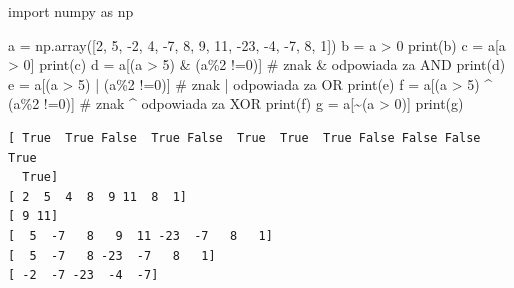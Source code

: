 \documentclass[
  polish,
  letterpaper,
  DIV=11,
  numbers=noendperiod]{scrreprt}
\newenvironment{Shaded}{\begin{snugshade}}{\end{snugshade}}
\newcommand{\BuiltInTok}[1]{\textcolor[rgb]{0.00,0.23,0.31}{#1}}
\newcommand{\CommentTok}[1]{\textcolor[rgb]{0.37,0.37,0.37}{#1}}
\newcommand{\DecValTok}[1]{\textcolor[rgb]{0.68,0.00,0.00}{#1}}
\newcommand{\ImportTok}[1]{\textcolor[rgb]{0.00,0.46,0.62}{#1}}
\newcommand{\NormalTok}[1]{\textcolor[rgb]{0.00,0.23,0.31}{#1}}
\newcommand{\OperatorTok}[1]{\textcolor[rgb]{0.37,0.37,0.37}{#1}}
\begin{document}
\begin{Shaded}
\begin{Highlighting}[]
\ImportTok{import}\NormalTok{ numpy }\ImportTok{as}\NormalTok{ np}

\NormalTok{a }\OperatorTok{=}\NormalTok{ np.array([}\DecValTok{2}\NormalTok{, }\DecValTok{5}\NormalTok{, }\OperatorTok{{-}}\DecValTok{2}\NormalTok{, }\DecValTok{4}\NormalTok{, }\OperatorTok{{-}}\DecValTok{7}\NormalTok{, }\DecValTok{8}\NormalTok{, }\DecValTok{9}\NormalTok{, }\DecValTok{11}\NormalTok{, }\OperatorTok{{-}}\DecValTok{23}\NormalTok{, }\OperatorTok{{-}}\DecValTok{4}\NormalTok{, }\OperatorTok{{-}}\DecValTok{7}\NormalTok{, }\DecValTok{8}\NormalTok{, }\DecValTok{1}\NormalTok{])}
\NormalTok{b }\OperatorTok{=}\NormalTok{ a }\OperatorTok{\textgreater{}} \DecValTok{0}
\BuiltInTok{print}\NormalTok{(b)}
\NormalTok{c }\OperatorTok{=}\NormalTok{ a[a }\OperatorTok{\textgreater{}} \DecValTok{0}\NormalTok{]}
\BuiltInTok{print}\NormalTok{(c)}
\NormalTok{d }\OperatorTok{=}\NormalTok{ a[(a }\OperatorTok{\textgreater{}} \DecValTok{5}\NormalTok{) }\OperatorTok{\&}\NormalTok{ (a}\OperatorTok{\%}\DecValTok{2} \OperatorTok{!=}\DecValTok{0}\NormalTok{)] }\CommentTok{\# znak \& odpowiada za AND}
\BuiltInTok{print}\NormalTok{(d)}
\NormalTok{e }\OperatorTok{=}\NormalTok{ a[(a }\OperatorTok{\textgreater{}} \DecValTok{5}\NormalTok{) }\OperatorTok{|}\NormalTok{ (a}\OperatorTok{\%}\DecValTok{2} \OperatorTok{!=}\DecValTok{0}\NormalTok{)] }\CommentTok{\# znak | odpowiada za OR}
\BuiltInTok{print}\NormalTok{(e)}
\NormalTok{f }\OperatorTok{=}\NormalTok{ a[(a }\OperatorTok{\textgreater{}} \DecValTok{5}\NormalTok{) }\OperatorTok{\^{}}\NormalTok{ (a}\OperatorTok{\%}\DecValTok{2} \OperatorTok{!=}\DecValTok{0}\NormalTok{)] }\CommentTok{\# znak \^{} odpowiada za XOR}
\BuiltInTok{print}\NormalTok{(f)}
\NormalTok{g }\OperatorTok{=}\NormalTok{ a[}\OperatorTok{\textasciitilde{}}\NormalTok{(a }\OperatorTok{\textgreater{}} \DecValTok{0}\NormalTok{)]}
\BuiltInTok{print}\NormalTok{(g)}
\end{Highlighting}
\end{Shaded}

\begin{verbatim}
[ True  True False  True False  True  True  True False False False  True
  True]
[ 2  5  4  8  9 11  8  1]
[ 9 11]
[  5  -7   8   9  11 -23  -7   8   1]
[  5  -7   8 -23  -7   8   1]
[ -2  -7 -23  -4  -7]
\end{verbatim}
\end{document}
